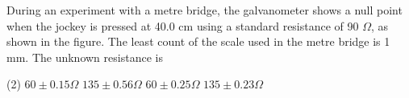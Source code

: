 
\item During an experiment with a metre bridge, the galvanometer shows a null point when the jockey is pressed at 40.0 cm using a standard resistance of 90 \(\Omega\), as shown in the figure. The least count of the scale used in the metre bridge is 1 mm. The unknown resistance is
    \begin{center}
    \end{center}
    \begin{tasks}(2)
        \task \(60 \pm 0.15\Omega\)
        \task \(135 \pm 0.56\Omega\)
        \task \(60 \pm 0.25\Omega\)
        \task \(135 \pm 0.23\Omega\)
    \end{tasks}
